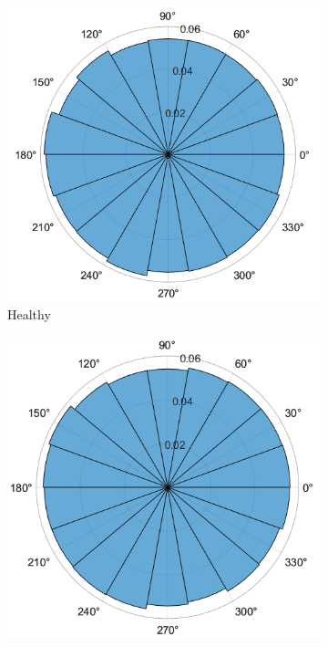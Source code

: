 \documentclass[hidelinks,12pt]{article}
\begin{document}
	\begin{figure}[bh!]
		\centering
		
		\begin{subfigure}[b]{0.3\textwidth}
			\centering
			\includegraphics[width=\textwidth]{7}
			\caption{Healthy}
		\end{subfigure}
		\hfill
		\begin{subfigure}[b]{0.3\textwidth}
			\centering
			\includegraphics[width=\textwidth]{8}

\end{subfigure}
\end{figure}
\end{document}
